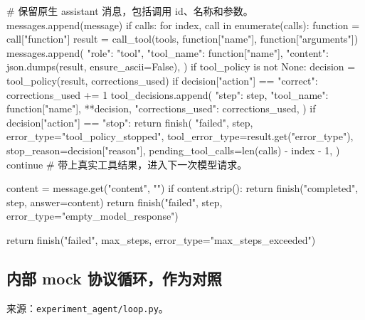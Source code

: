 \begin{Code}
        # 保留原生 assistant 消息，包括调用 id、名称和参数。
        messages.append(message)
        if calls:
            for index, call in enumerate(calls):
                function = call["function"]
                result = call_tool(tools, function["name"], function["arguments"])
                messages.append({
                    "role": "tool",
                    "tool_name": function["name"],
                    "content": json.dumps(result, ensure_ascii=False),
                })
                if tool_policy is not None:
                    decision = tool_policy(result, corrections_used)
                    if decision["action"] == "correct":
                        corrections_used += 1
                    tool_decisions.append({
                        "step": step,
                        "tool_name": function["name"],
                        **decision,
                        "corrections_used": corrections_used,
                    })
                    if decision["action"] == "stop":
                        return finish(
                            "failed", step,
                            error_type="tool_policy_stopped",
                            tool_error_type=result.get("error_type"),
                            stop_reason=decision["reason"],
                            pending_tool_calls=len(calls) - index - 1,
                        )
            continue  # 带上真实工具结果，进入下一次模型请求。

        content = message.get("content", "")
        if content.strip():
            return finish("completed", step, answer=content)
        return finish("failed", step, error_type="empty_model_response")

    return finish("failed", max_steps, error_type="max_steps_exceeded")
\end{Code}

\subsection{内部 mock 协议循环，作为对照}

来源：\nolinkurl{experiment_agent/loop.py}。

